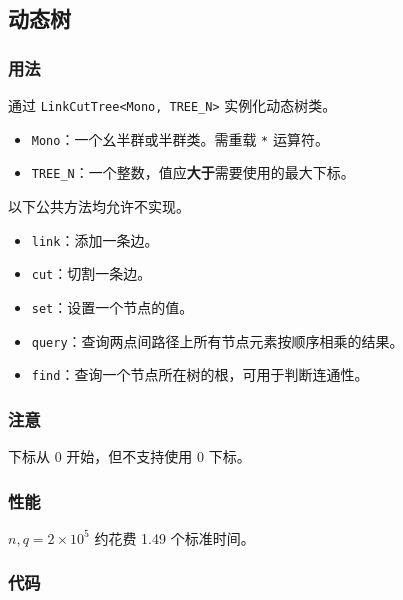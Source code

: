 \subsection{动态树}

\subsubsection{用法}

通过 \lstinline{LinkCutTree<Mono, TREE_N>} 实例化动态树类。

\begin{itemize}
\item \lstinline{Mono}：一个幺半群或半群类。需重载 \lstinline{*} 运算符。
\item \lstinline{TREE_N}：一个整数，值应\textbf{大于}需要使用的最大下标。
\end{itemize}

以下公共方法均允许不实现。

\begin{itemize}
\item \lstinline{link}：添加一条边。
\item \lstinline{cut}：切割一条边。
\item \lstinline{set}：设置一个节点的值。
\item \lstinline{query}：查询两点间路径上所有节点元素按顺序相乘的结果。
\item \lstinline{find}：查询一个节点所在树的根，可用于判断连通性。
\end{itemize}

\subsubsection{注意}

下标从 0 开始，但不支持使用 0 下标。

\subsubsection{性能}

$n, q = 2\times 10^5$ 约花费 1.49 个标准时间。

\subsubsection{代码}


